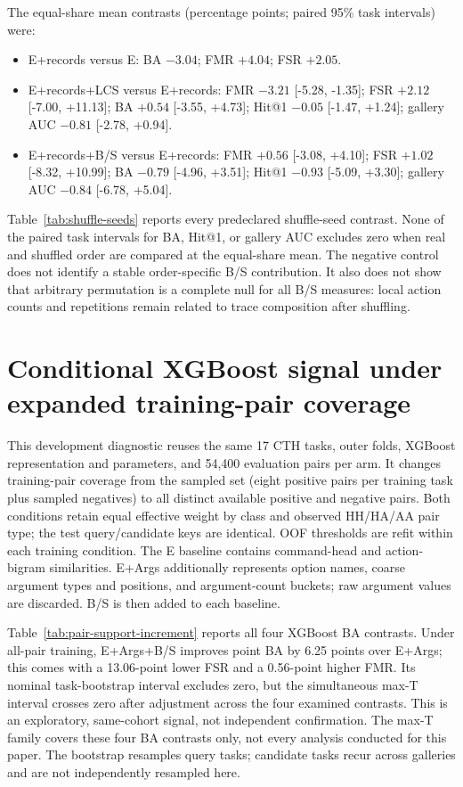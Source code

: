 \documentclass[10pt]{article}
\begin{document}
The equal-share mean contrasts (percentage points; paired 95\% task intervals) were:

\begin{itemize}
\item E+records versus E: BA $-3.04$; FMR $+4.04$; FSR $+2.05$.
\item E+records+LCS versus E+records: FMR $-3.21$ [-5.28, -1.35]; FSR $+2.12$ [-7.00, +11.13]; BA $+0.54$ [-3.55, +4.73]; Hit@1 $-0.05$ [-1.47, +1.24]; gallery AUC $-0.81$ [-2.78, +0.94].
\item E+records+B/S versus E+records: FMR $+0.56$ [-3.08, +4.10]; FSR $+1.02$ [-8.32, +10.99]; BA $-0.79$ [-4.96, +3.51]; Hit@1 $-0.93$ [-5.09, +3.30]; gallery AUC $-0.84$ [-6.78, +5.04].
\end{itemize}

Table~\ref{tab:shuffle-seeds} reports every predeclared shuffle-seed contrast. None of the paired task intervals for BA, Hit@1, or gallery AUC excludes zero when real and shuffled order are compared at the equal-share mean. The negative control does not identify a stable order-specific B/S contribution. It also does not show that arbitrary permutation is a complete null for all B/S measures: local action counts and repetitions remain related to trace composition after shuffling.

\section{Conditional XGBoost signal under expanded training-pair coverage}
\label{sec:pairsupport}
This development diagnostic reuses the same 17 CTH tasks, outer folds, XGBoost representation and parameters, and 54,400 evaluation pairs per arm. It changes training-pair coverage from the sampled set (eight positive pairs per training task plus sampled negatives) to all distinct available positive and negative pairs. Both conditions retain equal effective weight by class and observed HH/HA/AA pair type; the test query/candidate keys are identical. OOF thresholds are refit within each training condition. The E baseline contains command-head and action-bigram similarities. E+Args additionally represents option names, coarse argument types and positions, and argument-count buckets; raw argument values are discarded. B/S is then added to each baseline.

Table~\ref{tab:pair-support-increment} reports all four XGBoost BA contrasts. Under all-pair training, E+Args+B/S improves point BA by 6.25 points over E+Args; this comes with a 13.06-point lower FSR and a 0.56-point higher FMR. Its nominal task-bootstrap interval excludes zero, but the simultaneous max-T interval crosses zero after adjustment across the four examined contrasts. This is an exploratory, same-cohort signal, not independent confirmation. The max-T family covers these four BA contrasts only, not every analysis conducted for this paper. The bootstrap resamples query tasks; candidate tasks recur across galleries and are not independently resampled here.
\end{document}
